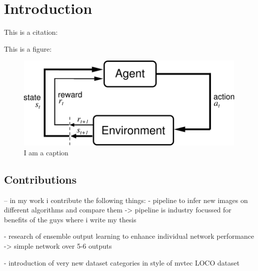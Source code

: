 \chapter{Introduction}
\label{chap:introduction}
This is a citation: \cite{Vaswani2017}


This is a figure: 

\begin{figure}[ht]
    \centering
    \includegraphics[width=.5\textwidth]{figures/AgentEnviornment.png}
    \caption{I am a caption}
    \label{fig:my_label}
\end{figure}








\section{Contributions}
-- in my work i contribute the following things:
- pipeline to infer new images on different algorithms and compare them
-> pipeline is industry focussed for benefits of the guys where i write my thesis

- research of ensemble output learning to enhance individual network performance
-> simple network over 5-6 outputs

- introduction of very new dataset categories in style of mvtec LOCO dataset


